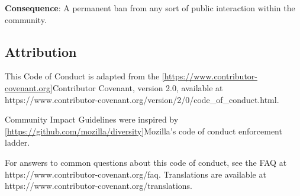 \textbf{Consequence}: A permanent ban from any sort of public
interaction within the community.

\subsection{Attribution}\label{attribution}

This Code of Conduct is adapted from the
\ref{https://www.contributor-covenant.org}{Contributor Covenant},
version 2.0, available at
https://www.contributor-covenant.org/version/2/0/code\_of\_conduct.html.

Community Impact Guidelines were inspired by
\ref{https://github.com/mozilla/diversity}{Mozilla's code of conduct
enforcement ladder}.

For answers to common questions about this code of conduct, see the FAQ
at https://www.contributor-covenant.org/faq. Translations are available
at https://www.contributor-covenant.org/translations.
